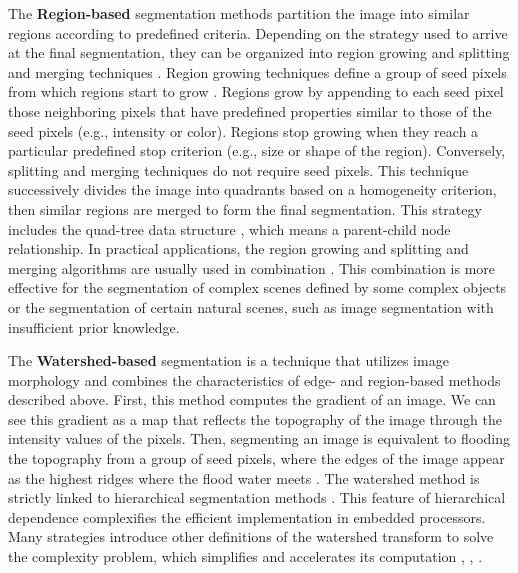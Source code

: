The \textbf{Region-based} segmentation methods partition the image into similar regions according to predefined criteria. Depending on the strategy used to arrive at the final segmentation, they can be organized into region growing and splitting and merging techniques \citep{Sezgin.Sankur:EI:2010}. Region growing techniques define a group of seed pixels from which regions start to grow \citep{Zucker:CGIP:1976, Adams.Bischof:TPAMI:1994}. Regions grow by appending to each seed pixel those neighboring pixels that have predefined properties similar to those of the seed pixels (e.g., intensity or color). Regions stop growing when they reach a particular predefined stop criterion (e.g., size or shape of the region).
Conversely, splitting and merging techniques do not require seed pixels. This technique successively divides the image into quadrants based on a homogeneity criterion, then similar regions are merged to form the final segmentation. This strategy includes the quad-tree data structure \citep{Horowitz.Pavlidis:ACM:1976}, which means a parent-child node relationship.
In practical applications, the region growing and splitting and merging algorithms are usually used in combination \citep{Ikonomatakis.Plataniotis.ea:ICDSP:1997}. This combination is more effective for the segmentation of complex scenes defined by some complex objects or the segmentation of certain natural scenes, such as image segmentation with insufficient prior knowledge.

The \textbf{Watershed-based} segmentation is a technique that utilizes image morphology and combines the characteristics of edge- and region-based methods described above. First, this method computes the gradient of an image. We can see this gradient as a map that reflects the topography of the image through the intensity values of the pixels. Then, segmenting an image is equivalent to flooding the topography from a group of seed pixels, where the edges of the image appear as the highest ridges where the flood water meets \citep{Meyer.Beucher:JVCIR:1990, Beucher.Meyer:Book:1993}. The watershed method is strictly linked to hierarchical segmentation methods \citep{Najman.Schmitt:PAMI:1996}. This feature of hierarchical dependence complexifies the efficient implementation in embedded processors. Many strategies introduce other definitions of the watershed transform to solve the complexity problem,  which simplifies and accelerates its computation \citep{Roerdink.Meijster:IOS:2000} , \citep{Dejnozkova.Dokladal:ICASSP:2003}, \citep{Chabardes.Dokladal.ea:ICIP:2016}.

